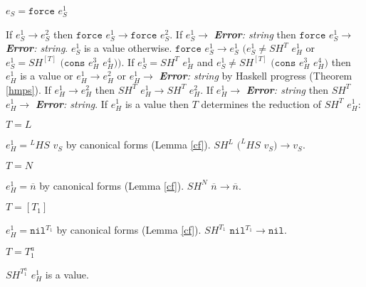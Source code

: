 \begin{case}

$e_{S}=\mathtt{force}$ $e_{S}^{1}$

If $e_{S}^{1}\rightarrow e_{S}^{2}$ then $\mathtt{force}$ $e_{S}^{1}\rightarrow\mathtt{force}$ $e_{S}^{2}$.  If $e_{S}^{1}\rightarrow$ \emph{\textbf{Error}: string} then $\mathtt{force}$ $e_{S}^{1}\rightarrow$ \emph{\textbf{Error}: string}.  $e_{S}^{1}$ is a value otherwise.  $\mathtt{force}$ $e_{S}^{1}\rightarrow e_{S}^{1}$ $(e_{S}^{1}\neq SH^{T}$ $e_{H}^{1}$ or $e_{S}^{1}=SH^{[T]}$ $(\mathtt{cons}$ $e_{H}^{3}$ $e_{H}^{4}))$.  If $e_{S}^{1}=SH^{T}$ $e_{H}^{1}$ and $e_{S}^{1}\neq SH^{[T]}$ $(\mathtt{cons}$ $e_{H}^{3}$ $e_{H}^{4})$ then $e_{H}^{1}$ is a value or $e_{H}^{1}\rightarrow e_{H}^{2}$ or $e_{H}^{1}\rightarrow$ \emph{\textbf{Error}: string} by Haskell progress (Theorem \ref{hmps}).  If $e_{H}^{1}\rightarrow e_{H}^{2}$ then $SH^{T}$ $e_{H}^{1}\rightarrow SH^{T}$ $e_{H}^{2}$.  If $e_{H}^{1}\rightarrow$ \emph{\textbf{Error}: string} then $SH^{T}$ $e_{H}^{1}\rightarrow$ \emph{\textbf{Error}: string}.  If $e_{H}^{1}$ is a value then $T$ determines the reduction of $SH^{T}$ $e_{H}^{1}$:

\begin{subcase}

$T=L$

$e_{H}^{1}={^{L}H}S$ $v_{S}$ by canonical forms (Lemma \ref{cf}).  $SH^{L}$ $(^{L}HS$ $v_{S})\rightarrow v_{S}$.

\end{subcase}

\begin{subcase}

$T=N$

$e_{H}^{1}=\overline{n}$ by canonical forms (Lemma \ref{cf}).  $SH^{N}$ $\overline{n}\rightarrow\overline{n}$.

\end{subcase}

\begin{subcase}

$T=[T_{1}]$

$e_{H}^{1}=\mathtt{nil}^{T_{1}}$ by canonical forms (Lemma \ref{cf}).  $SH^{T_{1}}$ $\mathtt{nil}^{T_{1}}\rightarrow\mathtt{nil}$.

\end{subcase}

\begin{subcase}

$T=T_{1}^{a}$

$SH^{T_{1}^{a}}$ $e_{H}^{1}$ is a value.


\end{subcase}
\end{case}
